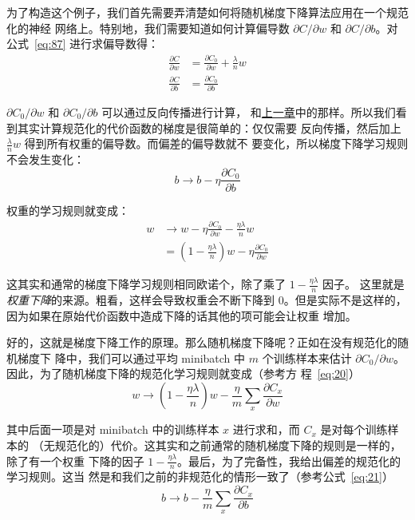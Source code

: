 为了构造这个例子，我们首先需要弄清楚如何将随机梯度下降算法应用在一个规范化的神经
网络上。特别地，我们需要知道如何计算偏导数 $\partial C/\partial w$ 和
$\partial C/\partial b$。对公式~\eqref{eq:87} 进行求偏导数得：
\begin{align}
  \frac{\partial C}{\partial w} & = \frac{\partial C_0}{\partial w} +
                                  \frac{\lambda}{n} w \label{eq:88}\tag{88} \\
  \frac{\partial C}{\partial b} & = \frac{\partial C_0}{\partial b} \label{eq:89}\tag{89}
\end{align}

$\partial C_0/\partial w$ 和 $\partial C_0/\partial b$ 可以通过反向传播进行计算，
和\hyperref[ch:HowTheBackpropagationAlgorithmWorks]{上一章}中的那样。所以我们看到其实计算规范化的代价函数的梯度是很简单的：仅仅需要
反向传播，然后加上 $\frac{\lambda}{n} w$ 得到所有权重的偏导数。而偏差的偏导数就不
要变化，所以梯度下降学习规则不会发生变化：
\begin{equation}
  b \rightarrow b -\eta \frac{\partial C_0}{\partial b}
  \label{eq:90}\tag{90}
\end{equation}

权重的学习规则就变成：
\begin{align}
  w & \rightarrow w-\eta \frac{\partial C_0}{\partial
      w}-\frac{\eta \lambda}{n} w \label{eq:91}\tag{91}\\
    & = \left(1-\frac{\eta \lambda}{n}\right) w -\eta \frac{\partial
      C_0}{\partial w} \label{eq:92}\tag{92}
\end{align}

这其实和通常的梯度下降学习规则相同欧诺个，除了乘了 $1-\frac{\eta\lambda}{n}$ 因子。
这里就是\emph{权重下降}的来源。粗看，这样会导致权重会不断下降到
$0$。但是实际不是这样的，因为如果在原始代价函数中造成下降的话其他的项可能会让权重
增加。

好的，这就是梯度下降工作的原理。那么随机梯度下降呢？正如在没有规范化的随机梯度下
降中，我们可以通过平均 minibatch 中 $m$ 个训练样本来估计
$\partial C_0/\partial w$。因此，为了随机梯度下降的规范化学习规则就变成（参考方
程~\eqref{eq:20}）
\begin{equation}
  w \rightarrow \left(1-\frac{\eta \lambda}{n}\right) w -\frac{\eta}{m}
  \sum_x \frac{\partial C_x}{\partial w}
  \label{eq:93}\tag{93}
\end{equation}

其中后面一项是对 minibatch 中的训练样本 $x$ 进行求和，而 $C_x$ 是对每个训练样本的
（无规范化的）代价。这其实和之前通常的随机梯度下降的规则是一样的，除了有一个权重
下降的因子
$1-\frac{\eta \lambda}{n}$。最后，为了完备性，我给出偏差的规范化的学习规则。这当
然是和我们之前的非规范化的情形一致了（参考公式~\eqref{eq:21}）
\begin{equation}
  b \rightarrow b - \frac{\eta}{m} \sum_x \frac{\partial C_x}{\partial b}
  \label{eq:94}\tag{94}
\end{equation}

